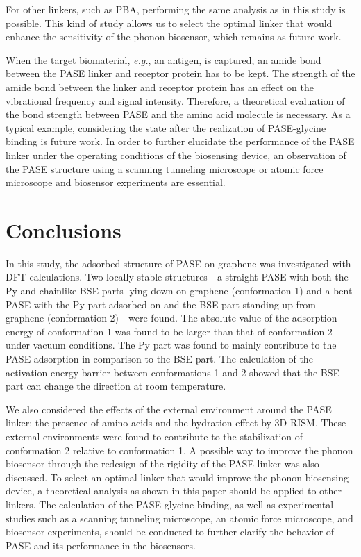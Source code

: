 \documentclass[journal=acsodf,manuscript=article]{achemso}
\begin{document}
For other linkers, such as PBA, performing the same analysis as in this study is possible. This kind of study allows us to select the optimal linker that would enhance the sensitivity of the phonon biosensor, which remains as future work.

When the target biomaterial, {\it e.g.}, an antigen, is captured, an amide bond between the PASE linker and receptor protein has to be kept. The strength of the amide bond between the linker and receptor protein has an effect on the vibrational frequency and signal intensity. Therefore, a theoretical evaluation of the bond strength between PASE and the amino acid molecule is necessary. As a typical example, considering the state after the realization of PASE-glycine binding is future work. In order to further elucidate the performance of the PASE linker under the operating conditions of the biosensing device, an observation of the PASE structure using a scanning tunneling microscope or atomic force microscope and biosensor experiments are essential.

\section{Conclusions}

In this study, the adsorbed structure of PASE on graphene was investigated with DFT calculations. Two locally stable structures---a straight PASE with both the Py and chainlike BSE parts lying down on graphene (conformation 1) and a bent PASE with the Py part adsorbed on and the BSE part standing up from graphene (conformation 2)---were found. The absolute value of the adsorption energy of conformation 1 was found to be larger than that of conformation 2 under vacuum conditions. The Py part was found to mainly contribute to the PASE adsorption in comparison to the BSE part. The calculation of the activation energy barrier between conformations 1 and 2 showed that the BSE part can change the direction at room temperature.

We also considered the effects of the external environment around the PASE linker: the presence of amino acids and the hydration effect by 3D-RISM. These external environments were found to contribute to the stabilization of conformation 2 relative to conformation 1. A possible way to improve the phonon biosensor through the redesign of the rigidity of the PASE linker was also discussed. To select an optimal linker that would improve the phonon biosensing device, a theoretical analysis as shown in this paper should be applied to other linkers. The calculation of the PASE-glycine binding, as well as experimental studies such as a scanning tunneling microscope, an atomic force microscope, and biosensor experiments, should be conducted to further clarify the behavior of PASE and its performance in the biosensors.
\end{document}
